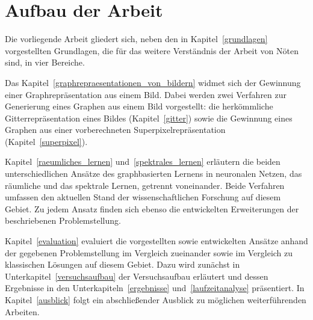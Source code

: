\section{Aufbau der Arbeit}
\label{aufbau_der_arbeit}

Die vorliegende Arbeit gliedert sich, neben den in Kapitel~\ref{grundlagen} vorgestellten Grundlagen, die für das weitere Verständnis der Arbeit von Nöten sind, in vier Bereiche.

Das Kapitel~\ref{graphrepraesentationen_von_bildern} widmet sich der Gewinnung einer Graphrepräsentation aus einem Bild.
Dabei werden zwei Verfahren zur Generierung eines Graphen aus einem Bild vorgestellt: die herkömmliche Gitterrepräsentation eines Bildes (Kapitel~\ref{gitter}) sowie die Gewinnung eines Graphen aus einer vorberechneten Superpixelrepräsentation (Kapitel~\ref{superpixel}).

Kapitel~\ref{raeumliches_lernen} und~\ref{spektrales_lernen} erläutern die beiden unterschiedlichen Ansätze des graphbasierten Lernens in neuronalen Netzen, das räumliche und das spektrale Lernen, getrennt voneinander.
Beide Verfahren umfassen den aktuellen Stand der wissenschaftlichen Forschung auf diesem Gebiet.
Zu jedem Ansatz finden sich ebenso die entwickelten Erweiterungen \bzgl{} der beschriebenen Problemstellung.

Kapitel~\ref{evaluation} evaluiert die vorgestellten sowie entwickelten Ansätze anhand der gegebenen Problemstellung im Vergleich zueinander sowie im Vergleich zu klassischen Lösungen auf diesem Gebiet.
Dazu wird zunächst in Unterkapitel~\ref{versuchsaufbau} der Versuchsaufbau erläutert und dessen Ergebnisse in den Unterkapiteln~\ref{ergebnisse} und~\ref{laufzeitanalyse} präsentiert.
In Kapitel~\ref{ausblick} folgt ein abschließender Ausblick zu möglichen weiterführenden Arbeiten.
